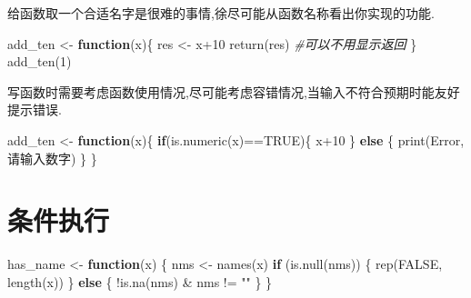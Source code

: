 \documentclass[
]{book}
\newenvironment{Shaded}{\begin{snugshade}}{\end{snugshade}}
\newcommand{\CommentTok}[1]{\textcolor[rgb]{0.56,0.35,0.01}{\textit{#1}}}
\newcommand{\ConstantTok}[1]{\textcolor[rgb]{0.00,0.00,0.00}{#1}}
\newcommand{\ControlFlowTok}[1]{\textcolor[rgb]{0.13,0.29,0.53}{\textbf{#1}}}
\newcommand{\DecValTok}[1]{\textcolor[rgb]{0.00,0.00,0.81}{#1}}
\newcommand{\FunctionTok}[1]{\textcolor[rgb]{0.00,0.00,0.00}{#1}}
\newcommand{\NormalTok}[1]{#1}
\newcommand{\OtherTok}[1]{\textcolor[rgb]{0.56,0.35,0.01}{#1}}
\newcommand{\SpecialCharTok}[1]{\textcolor[rgb]{0.00,0.00,0.00}{#1}}
\newcommand{\StringTok}[1]{\textcolor[rgb]{0.31,0.60,0.02}{#1}}
\begin{document}
给函数取一个合适名字是很难的事情,徐尽可能从函数名称看出你实现的功能.

\begin{Shaded}
\begin{Highlighting}[]
\NormalTok{add\_ten }\OtherTok{\textless{}{-}} \ControlFlowTok{function}\NormalTok{(x)\{}
\NormalTok{  res }\OtherTok{\textless{}{-}}\NormalTok{ x}\SpecialCharTok{+}\DecValTok{10}
  \FunctionTok{return}\NormalTok{(res) }\CommentTok{\#可以不用显示返回}
\NormalTok{\}}
\FunctionTok{add\_ten}\NormalTok{(}\DecValTok{1}\NormalTok{)}
\end{Highlighting}
\end{Shaded}

写函数时需要考虑函数使用情况,尽可能考虑容错情况,当输入不符合预期时能友好提示错误.

\begin{Shaded}
\begin{Highlighting}[]
\NormalTok{add\_ten }\OtherTok{\textless{}{-}} \ControlFlowTok{function}\NormalTok{(x)\{}
  \ControlFlowTok{if}\NormalTok{(}\FunctionTok{is.numeric}\NormalTok{(x)}\SpecialCharTok{==}\ConstantTok{TRUE}\NormalTok{)\{}
\NormalTok{    x}\SpecialCharTok{+}\DecValTok{10}
\NormalTok{  \} }\ControlFlowTok{else}\NormalTok{ \{}
    \FunctionTok{print}\NormalTok{(}\StringTok{\textquotesingle{}Error,请输入数字\textquotesingle{}}\NormalTok{)}
\NormalTok{  \}}
\NormalTok{\}}
\end{Highlighting}
\end{Shaded}

\hypertarget{ux6761ux4ef6ux6267ux884c}{%
\section{条件执行}\label{ux6761ux4ef6ux6267ux884c}}

\begin{Shaded}
\begin{Highlighting}[]
\NormalTok{has\_name }\OtherTok{\textless{}{-}} \ControlFlowTok{function}\NormalTok{(x) \{}
\NormalTok{  nms }\OtherTok{\textless{}{-}} \FunctionTok{names}\NormalTok{(x)}
  \ControlFlowTok{if}\NormalTok{ (}\FunctionTok{is.null}\NormalTok{(nms)) \{}
    \FunctionTok{rep}\NormalTok{(}\ConstantTok{FALSE}\NormalTok{, }\FunctionTok{length}\NormalTok{(x))}
\NormalTok{  \} }\ControlFlowTok{else}\NormalTok{ \{}
    \SpecialCharTok{!}\FunctionTok{is.na}\NormalTok{(nms) }\SpecialCharTok{\&}\NormalTok{ nms }\SpecialCharTok{!=} \StringTok{""}
\NormalTok{  \}}
\NormalTok{\}}
\end{Highlighting}
\end{Shaded}
\end{document}
